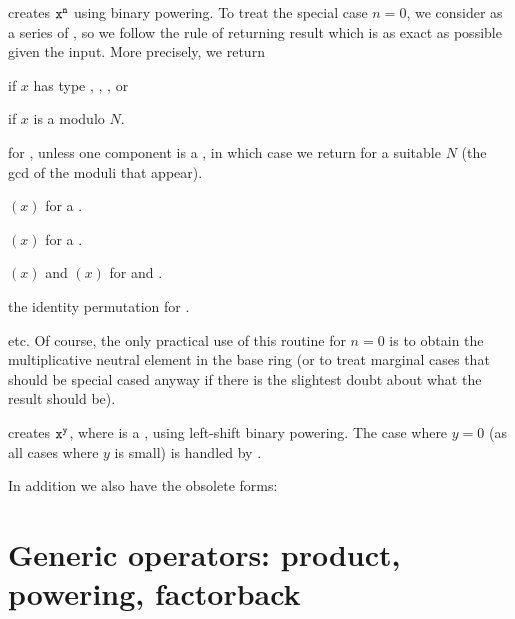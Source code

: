  creates ${\tt x}^{{\tt n}}$ using
binary powering. To treat the special case $n = 0$, we consider
 as a series of , so we follow the rule of returning
result which is as exact as possible given the input. More precisely,
we return
\item {} if $x$ has type , ,  , or

\item {} if $x$ is a  modulo $N$.

\item {} for ,  unless one component
is a , in which case we return  for a suitable
$N$ (the gcd of the moduli that appear).

\item {}$(x)$ for a .

\item {}$(x)$ for a .

\item {}$(x)$ and $(x)$ for  and .

\item the identity permutation for .

\item etc. Of course, the only practical use of this routine for $n = 0$ is
to obtain the multiplicative neutral element in the base ring (or to treat
marginal cases that should be special cased anyway if there is the slightest
doubt about what the result should be).

 creates ${\tt x}^{{\tt y}}$, where  is a
, using left-shift binary powering. The case where $y = 0$
(as all cases where $y$ is small) is handled by .

In addition we also have the obsolete forms:





\section{Generic operators: product, powering, factorback}

